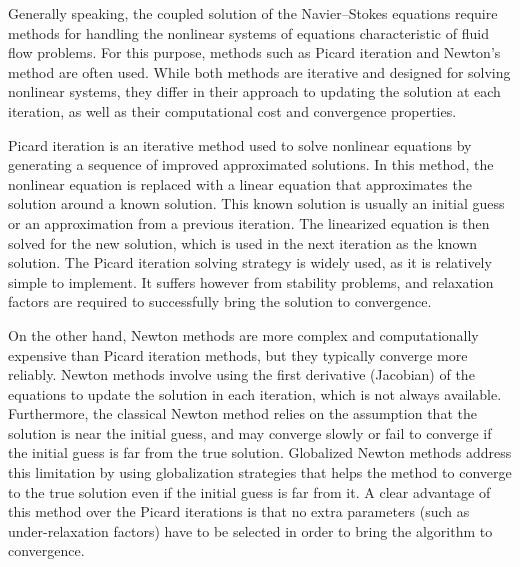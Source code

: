Generally speaking, the coupled solution of the Navier--Stokes equations require methods for handling the nonlinear systems of equations characteristic of fluid flow problems. For this purpose, methods such as Picard iteration and Newton's method are often used. While both methods are iterative and designed for solving nonlinear systems, they differ in their approach to updating the solution at each iteration, as well as their computational cost and convergence properties.

Picard iteration is an iterative method used to solve nonlinear equations by generating a sequence of improved approximated solutions. In this method, the nonlinear equation is replaced with a linear equation that approximates the solution around a known solution. This known solution is usually an initial guess or an approximation from a previous iteration. The linearized equation is then solved for the new solution, which is used in the next iteration as the known solution. The Picard iteration solving strategy is widely used, as it is relatively simple to implement. It suffers however from stability problems, and relaxation factors are required to successfully bring the solution to convergence. 

On the other hand, Newton methods are more complex and computationally expensive than Picard iteration methods, but they typically converge more reliably. Newton methods involve using the first derivative (Jacobian) of the equations to update the solution in each iteration, which is not always available. Furthermore, the classical Newton method relies on the assumption that the solution is near the initial guess, and may converge slowly or fail to converge if the initial guess is far from the true solution. Globalized Newton methods address this limitation by using globalization strategies that helps the method to converge to the true solution even if the initial guess is far from it. A clear advantage of this method over the Picard iterations is that no extra parameters (such as under-relaxation factors) have to be selected in order to bring the algorithm to convergence. 
 
